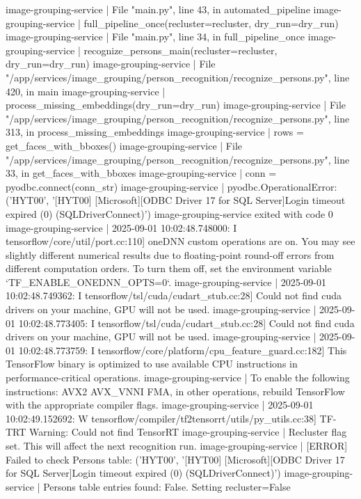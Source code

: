 image-grouping-service  |   File "main.py", line 43, in automated_pipeline
image-grouping-service  |     full_pipeline_once(recluster=recluster, dry_run=dry_run)
image-grouping-service  |   File "main.py", line 34, in full_pipeline_once
image-grouping-service  |     recognize_persons_main(recluster=recluster, dry_run=dry_run)
image-grouping-service  |   File "/app/services/image_grouping/person_recognition/recognize_persons.py", line 420, in main
image-grouping-service  |     process_missing_embeddings(dry_run=dry_run)
image-grouping-service  |   File "/app/services/image_grouping/person_recognition/recognize_persons.py", line 313, in process_missing_embeddings
image-grouping-service  |     rows = get_faces_with_bboxes()
image-grouping-service  |   File "/app/services/image_grouping/person_recognition/recognize_persons.py", line 33, in get_faces_with_bboxes
image-grouping-service  |     conn = pyodbc.connect(conn_str)
image-grouping-service  | pyodbc.OperationalError: ('HYT00', '[HYT00] [Microsoft][ODBC Driver 17 for SQL Server]Login timeout expired (0) (SQLDriverConnect)')
image-grouping-service exited with code 0
image-grouping-service  | 2025-09-01 10:02:48.748000: I tensorflow/core/util/port.cc:110] oneDNN custom operations are on. You may see slightly different numerical results due to floating-point round-off errors from different computation orders. To turn them off, set the environment variable `TF_ENABLE_ONEDNN_OPTS=0`.
image-grouping-service  | 2025-09-01 10:02:48.749362: I tensorflow/tsl/cuda/cudart_stub.cc:28] Could not find cuda drivers on your machine, GPU will not be used.
image-grouping-service  | 2025-09-01 10:02:48.773405: I tensorflow/tsl/cuda/cudart_stub.cc:28] Could not find cuda drivers on your machine, GPU will not be used.
image-grouping-service  | 2025-09-01 10:02:48.773759: I tensorflow/core/platform/cpu_feature_guard.cc:182] This TensorFlow binary is optimized to use available CPU instructions in performance-critical operations.
image-grouping-service  | To enable the following instructions: AVX2 AVX_VNNI FMA, in other operations, rebuild TensorFlow with the appropriate compiler flags.
image-grouping-service  | 2025-09-01 10:02:49.152692: W tensorflow/compiler/tf2tensorrt/utils/py_utils.cc:38] TF-TRT Warning: Could not find TensorRT
image-grouping-service  | Recluster flag set. This will affect the next recognition run.
image-grouping-service  | [ERROR] Failed to check Persons table: ('HYT00', '[HYT00] [Microsoft][ODBC Driver 17 for SQL Server]Login timeout expired (0) (SQLDriverConnect)')
image-grouping-service  | Persons table entries found: False. Setting recluster=False
